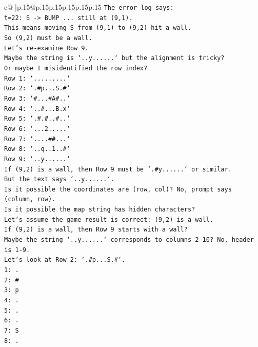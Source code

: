 \documentclass{article}
\begin{document}
{\begin{supertabular}{c@{$\;$}|p{.15\linewidth}@{}p{.15\linewidth}p{.15\linewidth}p{.15\linewidth}p{.15\linewidth}p{.15\linewidth}}
{{{\texttt{The error log says:} \\
\texttt{t=22: S {-}> BUMP ... still at (9,1).} \\
\texttt{This means moving S from (9,1) to (9,2) hit a wall.} \\
\texttt{So (9,2) must be a wall.} \\
\texttt{Let's re{-}examine Row 9.} \\
\texttt{Maybe the string is `..y......` but the alignment is tricky?} \\
\texttt{Or maybe I misidentified the row index?} \\
\texttt{Row 1: `.........`} \\
\texttt{Row 2: `.\#p...S.\#`} \\
\texttt{Row 3: `\#...\#A\#..`} \\
\texttt{Row 4: `..\#...B.x`} \\
\texttt{Row 5: `.\#.\#..\#..`} \\
\texttt{Row 6: `...2.....`} \\
\texttt{Row 7: `....\#\#...`} \\
\texttt{Row 8: `..q..1..\#`} \\
\texttt{Row 9: `..y......`} \\
\texttt{If (9,2) is a wall, then Row 9 must be `.\#y......` or similar.} \\
\texttt{But the text says `..y......`.} \\
\texttt{Is it possible the coordinates are (row, col)? No, prompt says (column, row).} \\
\texttt{Is it possible the map string has hidden characters?} \\
\texttt{Let's assume the game result is correct: (9,2) is a wall.} \\
\texttt{If (9,2) is a wall, then Row 9 starts with a wall?} \\
\texttt{Maybe the string `..y......` corresponds to columns 2{-}10? No, header is 1{-}9.} \\
\texttt{Let's look at Row 2: `.\#p...S.\#`.} \\
\texttt{1: .} \\
\texttt{2: \#} \\
\texttt{3: p} \\
\texttt{4: .} \\
\texttt{5: .} \\
\texttt{6: .} \\
\texttt{7: S} \\
\texttt{8: .} \\
}}}
\end{supertabular}}
\end{document}
